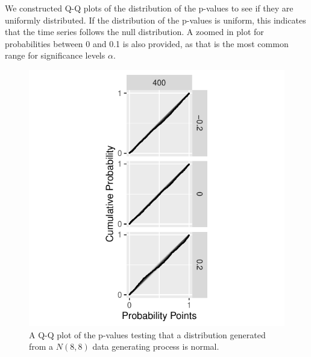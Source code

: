 \documentclass[12pt, letterpaper]{article}
\begin{document}
We constructed Q-Q plots of the distribution of the p-values to see if they are
uniformly distributed. If the distribution of the p-values is uniform, this 
indicates that the time series follows the null distribution. 
A zoomed in plot for probabilities between 0 and 0.1 is
also provided, as
that is the most common range for significance levels $\alpha$. 

\begin{figure}[tbp]
  \centering
  \includegraphics[scale=1]{figures/normal}
  \caption{A Q-Q plot of the p-values testing that a distribution
  generated from a $N(8,8)$ data generating process is normal.}
  \label{fig:mu}
\end{figure}
\end{document}
